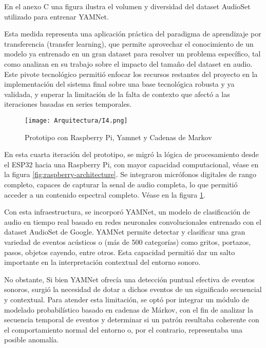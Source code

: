 En el anexo C una figura ilustra el volumen y diversidad del dataset AudioSet utilizado para entrenar YAMNet.

Esta medida representa una aplicación práctica del paradigma de aprendizaje por transferencia (transfer learning), que permite aprovechar el conocimiento de un modelo ya entrenado en un gran dataset para resolver un problema específico, tal como analizan \citeauthor{pons2019deep} \citeyear{pons2019deep} en su trabajo sobre el impacto del tamaño del dataset en audio. Este pivote tecnológico permitió enfocar los recursos restantes del proyecto en la implementación del sistema final sobre una base tecnológica robusta y ya validada, y superar la limitación de la falta de contexto que afectó a las iteraciones basadas en series temporales.


      \begin{figure}[ht!]
            \centering
            \texttt{[image: Arquitectura/I4.png]}
            \caption{Prototipo con Raspberry Pi, Yamnet y Cadenas de Markov}
            \label{fig:prototipo4}
      \end{figure}

      En esta cuarta iteración del prototipo, se migró la lógica de procesamiento desde el ESP32 hacia una Raspberry Pi, con mayor capacidad computacional, véase en la figura \ref{fig:raspberry-architecture}. Se integraron micrófonos digitales de rango completo, capaces de capturar la senal de audio completa, lo que permitió acceder a un contenido espectral  completo. Véase en la figura \ref{fig:prototipo4}.

      Con esta infraestructura, se incorporó YAMNet, un modelo de clasificación de audio en tiempo real basado en redes neuronales convolucionales entrenado con el dataset AudioSet de Google. YAMNet permite detectar y clasificar una gran variedad de eventos acústicos o (más de 500 categorías) como gritos, portazos, pasos, objetos cayendo, entre otros. Esta capacidad permitió dar un salto importante en la interpretación contextual del entorno sonoro.

      No obstante, Si bien YAMNet ofrecía una detección puntual efectiva de eventos sonoros, surgió la necesidad de dotar a dichos eventos de un significado secuencial y contextual. Para atender esta limitación, se optó por integrar un módulo de modelado probabilístico basado en cadenas de Márkov, con el fin de analizar la secuencia temporal de eventos y determinar si un patrón resultaba coherente con el comportamiento normal del entorno o, por el contrario, representaba una posible anomalía.

